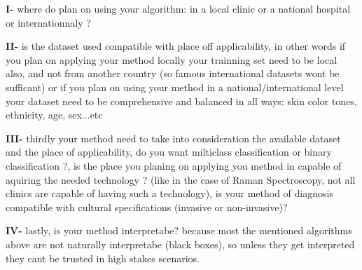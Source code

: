     \textbf{I-} where do plan on using your algorithm: in a local clinic or a national hospital or internationnaly ?
    
    \textbf{II-} is the dataset used compatible with place off applicability, in other words if you plan on applying your method locally your trainning set need to be local also, and not from another country (so famous international datasets wont be sufficant) or if you plan on using your method in a national/international level your dataset need to be comprehensive and balanced in all ways: skin color tones, ethnicity, age, sex...etc 
    
    \textbf{III-} thirdly your method need to take into consideration the available dataset and the place of applicability, do you want milticlass classification or binary classification ?, is the place you planing on applying you method in capable of aquiring the needed technology ? (like in the case of Raman Spectroscopy, not all clinics are capable of having such a technology), is your method of diagnosis compatible with cultural specifications (invasive or non-invasive)? 

    \textbf{IV-} lastly, is your method interpretabe? because most the mentioned algorithms above are not naturally interpretabe (black boxes), so unless they get interpreted they cant be trusted in high stakes scenarios.